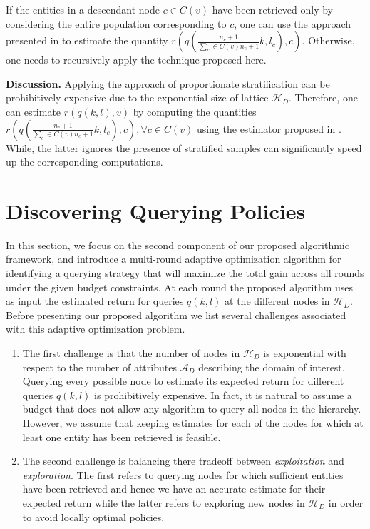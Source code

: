 \documentclass{vldb}
\newcommand{\attributes}{\mathcal{A}_D}
\newcommand{\hierarchy}{\mathcal{H}_D}
\begin{document}
If the entities in a descendant node $c \in C(v)$ have been retrieved only by considering the entire population corresponding to $c$, one can use the approach presented in  to estimate the quantity $r(q(\frac{n_c + 1}{\sum_c \in C(v) n_c+ 1} k,l_c),c)$. Otherwise, one needs to recursively apply the technique proposed here. 

\noindent \textbf{Discussion.} Applying the approach of proportionate stratification can be prohibitively expensive due to the exponential size of lattice $\hierarchy$. Therefore, one can estimate $r(q(k,l),v)$ by computing the quantities $r(q(\frac{n_c + 1}{\sum_c \in C(v) n_c+ 1} k,l_c),c), \forall c \in C(v)$ using the estimator proposed in . While, the latter ignores the presence of stratified samples can significantly speed up the corresponding computations. 

\section{Discovering Querying Policies}
\label{sec:solving}
In this section, we focus on the second component of our proposed algorithmic framework, and introduce a multi-round adaptive optimization algorithm for identifying a querying strategy that will maximize the total gain across all rounds under the given budget constraints. At each round the proposed algorithm uses as input the estimated return for queries $q(k,l)$ at the different nodes in $\hierarchy$. Before presenting our proposed algorithm we list several challenges associated with this adaptive optimization problem.

\begin{enumerate}
\item The first challenge is that the number of nodes in $\hierarchy$ is exponential with respect to the number of attributes $\attributes$ describing the domain of interest. Querying every possible node to estimate its expected return for different queries $q(k,l)$ is prohibitively expensive. In fact, it is natural to assume a budget that does not allow any algorithm to query all nodes in the hierarchy. However, we assume that keeping estimates for each of the nodes for which at least one entity has been retrieved is feasible. 
\item The second challenge is balancing there tradeoff between {\em exploitation} and {\em exploration}. The first refers to querying nodes for which sufficient entities have been retrieved and hence we have an accurate estimate for their expected return while the latter refers to exploring new nodes in $\hierarchy$ in order to avoid locally optimal policies.
\end{enumerate}
\end{document}
